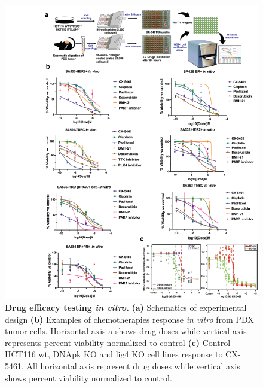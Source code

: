 \begin{figure}
	\centering
	\includegraphics[width=\textwidth]{Figures/invitro.png}
	\caption[Drug efficacy testing \textit{in vitro} ]
	{\small
	    \textbf{Drug efficacy testing \textit{in vitro}.}
	    \textbf{(a)} Schematics of experimental design
	    \textbf{(b)} Examples of chemotherapies response \textit{in vitro} from PDX tumor cells. Horizontal axis a shows drug doses while vertical axis represents percent viability normalized to control
	    \textbf{(c)} Control HCT116 wt, DNApk KO and lig4 KO cell lines response to CX-5461. All horizontal axis represent drug doses while vertical axis shows percent viability normalized to control.
	}
	\label{fig:invitro}
\end{figure}



